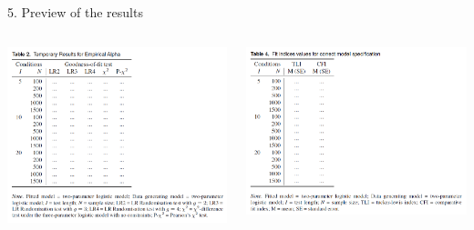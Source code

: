 \documentclass[aspectratio=169]{beamer}
\begin{document}
\begin{frame}{5. Preview of the results}

\begin{columns}

\begin{column}{0.5\textwidth}
\includegraphics[width = \textwidth]{images/table2.png}
\end{column}

\begin{column}{0.5\textwidth}
\includegraphics[width = \textwidth]{images/table3.png}
\end{column}

\end{columns}

\end{frame}
\end{document}
